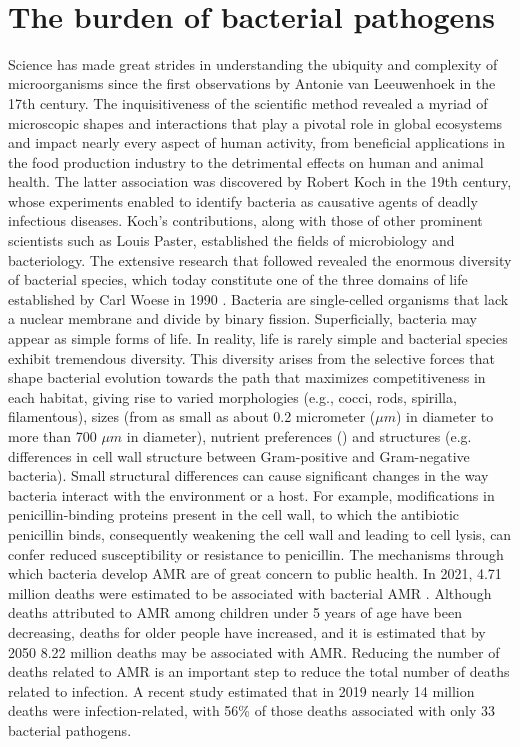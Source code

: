 \renewcommand*{\thefootnote}{\arabic{footnote}}

\mbox{}\\
\vspace{8cm}

\section{The burden of bacterial pathogens}

Science has made great strides in understanding the ubiquity and complexity of microorganisms since the first observations by Antonie van Leeuwenhoek in the 17th century. The inquisitiveness of the scientific method revealed a myriad of microscopic shapes and interactions that play a pivotal role in global ecosystems and impact nearly every aspect of human activity, from beneficial applications in the food production industry to the detrimental effects on human and animal health. The latter association was discovered by Robert Koch in the 19th century, whose experiments enabled to identify bacteria as causative agents of deadly infectious diseases. Koch’s contributions, along with those of other prominent scientists such as Louis Paster, established the fields of microbiology and bacteriology. The extensive research that followed revealed the enormous diversity of bacterial species, which today constitute one of the three domains of life established by Carl Woese in 1990 \cite{woese_towards_1990}.
Bacteria are single-celled organisms that lack a nuclear membrane and divide by binary fission. Superficially, bacteria may appear as simple forms of life. In reality, life is rarely simple and bacterial species exhibit tremendous diversity. This diversity arises from the selective forces that shape bacterial evolution towards the path that maximizes competitiveness in each habitat, giving rise to varied morphologies (e.g., cocci, rods, spirilla, filamentous), sizes (from as small as about 0.2 micrometer ($\mu m$) in diameter to more than 700 $\mu m$ in diameter), nutrient preferences () and structures (e.g. differences in cell wall structure between Gram-positive and Gram-negative bacteria).
Small structural differences can cause significant changes in the way bacteria interact with the environment or a host. For example, modifications in penicillin-binding proteins present in the cell wall, to which the antibiotic penicillin binds, consequently weakening the cell wall and leading to cell lysis, can confer reduced susceptibility or resistance to penicillin. The mechanisms through which bacteria develop \ac{AMR} are of great concern to public health. In 2021, 4.71 million deaths were estimated to be associated with bacterial \ac{AMR} \cite{naghavi_global_2024}. Although deaths attributed to \ac{AMR} among children under 5 years of age have been decreasing, deaths for older people have increased, and it is estimated that by 2050 8.22 million deaths may be associated with \ac{AMR}. Reducing the number of deaths related to \ac{AMR} is an important step to reduce the total number of deaths related to infection. A recent study estimated that in 2019 nearly 14 million deaths were infection-related, with 56\% of those deaths associated with only 33 bacterial pathogens.

